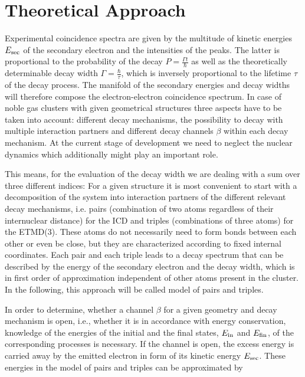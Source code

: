 \section{Theoretical Approach}
%
Experimental coincidence spectra are given by the multitude of
kinetic energies $E_{\rm sec}$ of the secondary electron
and the intensities of the peaks. The latter is proportional to the
probability of the decay $P=\frac{\Gamma t}{\hbar}$
as well as the theoretically determinable
decay width $\Gamma=\frac{\hbar}{\tau}$,
which is inversely proportional to the lifetime $\tau$ of the decay process.
The manifold of the
secondary energies and decay widths will therefore compose the electron-electron
coincidence spectrum.
In case of noble gas clusters
with given geometrical structures three aspects have to be taken into account:
different decay mechanisms, the possibility to decay with multiple
interaction partners and different decay channels $\beta$ within
each decay mechanism.
At the current stage of development we need to neglect the nuclear dynamics which
additionally might play an important role.


This means, for the evaluation of the decay width we are dealing with a sum over three different indices: 
For a given structure it is most convenient to
start with a decomposition of the system into interaction partners of
the different relevant decay mechanisms, i.e. pairs (combination of two atoms regardless
of their internuclear distance) for the ICD and triples (combinations of three atoms)
for the ETMD(3).
These atoms do not necessarily need to form bonds between each other or
even be close, but they are characterized according to fixed internal
coordinates. 
Each pair and each triple leads to a decay spectrum that can be described by the energy of the secondary electron and the decay width, which is in first order of approximation independent of other atoms present in the cluster.
In the following, this approach will be called model of pairs and triples.


In order to determine, whether a channel $\beta$ for a given geometry and decay
mechanism is open, i.e., whether it is in accordance with energy conservation,
knowledge of the energies of the initial and the final states, $E_{\rm in}$ and $E_{\rm fin}$, of
the corresponding processes is necessary.
If the channel
is open, the excess energy is carried away by the emitted electron
in form of its kinetic energy $E_{\rm sec}$. These energies in the model
of pairs and triples can be approximated by

